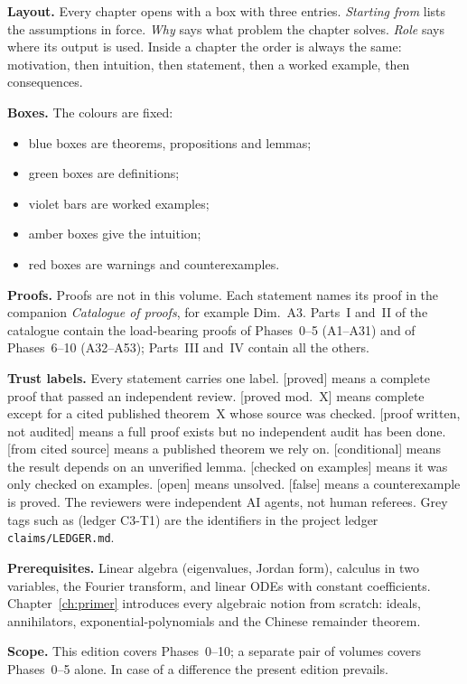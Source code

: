 \documentclass[11pt]{article}
\theoremstyle{plain}
\theoremstyle{definition}
\theoremstyle{remark}
\newcommand{\badge}[2]{\textcolor{#1}{\textsf{\footnotesize[#2]}}}
\newcommand{\proved}[1][]{\badge{cC}{proved#1}}
\newcommand{\modulo}[1]{\badge{cD}{proved mod.\ #1}}
\newcommand{\condl}{\badge{cD}{conditional}}
\newcommand{\openq}{\badge{cB}{open}}
\newcommand{\falsest}{\badge{cB}{false}}
\newcommand{\led}[1]{\textcolor{cG}{\textsf{\footnotesize(ledger #1)}}}
\newcommand{\pw}{\badge{cD}{proof written, not audited}}
\newcommand{\cf}{\badge{cD}{from cited source}}
\newcommand{\vex}{\badge{cD}{checked on examples}}
\begin{document}
\textbf{Layout.} Every chapter opens with a box with three entries. \emph{Starting from} lists the assumptions in force. \emph{Why} says what problem the chapter solves. \emph{Role} says where its output is used. Inside a chapter the order is always the same: motivation, then intuition, then statement, then a worked example, then consequences.

\textbf{Boxes.} The colours are fixed:
\begin{itemize}
\item blue boxes are theorems, propositions and lemmas;
\item green boxes are definitions;
\item violet bars are worked examples;
\item amber boxes give the intuition;
\item red boxes are warnings and counterexamples.
\end{itemize}

\textbf{Proofs.} Proofs are not in this volume. Each statement names its proof in the companion \emph{Catalogue of proofs}, for example \textsf{\footnotesize\color{cA}Dim.~A3}. Parts~I and~II of the catalogue contain the load-bearing proofs of Phases~0--5 (A1--A31) and of Phases~6--10 (A32--A53); Parts~III and~IV contain all the others.

\textbf{Trust labels.} Every statement carries one label. \proved{} means a complete proof that passed an independent review. \modulo{X} means complete except for a cited published theorem~X whose source was checked. \pw{} means a full proof exists but no independent audit has been done. \cf{} means a published theorem we rely on. \condl{} means the result depends on an unverified lemma. \vex{} means it was only checked on examples. \openq{} means unsolved. \falsest{} means a counterexample is proved. The reviewers were independent AI agents, not human referees. Grey tags such as \led{C3-T1} are the identifiers in the project ledger \texttt{claims/LEDGER.md}.

\textbf{Prerequisites.} Linear algebra (eigenvalues, Jordan form), calculus in two variables, the Fourier transform, and linear ODEs with constant coefficients. Chapter~\ref{ch:primer} introduces every algebraic notion from scratch: ideals, annihilators, exponential-polynomials and the Chinese remainder theorem.

\textbf{Scope.} This edition covers Phases~0--10; a separate pair of volumes covers Phases~0--5 alone. In case of a difference the present edition prevails. 
\end{document}
